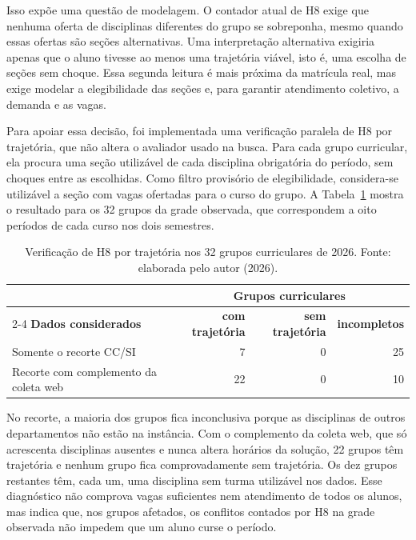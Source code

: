 Isso expõe uma questão de modelagem. O contador atual de H8 exige que nenhuma oferta de disciplinas diferentes do grupo se sobreponha, mesmo quando essas ofertas são seções alternativas. Uma interpretação alternativa exigiria apenas que o aluno tivesse ao menos uma trajetória viável, isto é, uma escolha de seções sem choque. Essa segunda leitura é mais próxima da matrícula real, mas exige modelar a elegibilidade das seções e, para garantir atendimento coletivo, a demanda e as vagas.

Para apoiar essa decisão, foi implementada uma verificação paralela de H8 por trajetória, que não altera o avaliador usado na busca. Para cada grupo curricular, ela procura uma seção utilizável de cada disciplina obrigatória do período, sem choques entre as escolhidas. Como filtro provisório de elegibilidade, considera-se utilizável a seção com vagas ofertadas para o curso do grupo. A Tabela~\ref{tab:trajetorias} mostra o resultado para os 32 grupos da grade observada, que correspondem a oito períodos de cada curso nos dois semestres.

\begin{table}[htbp]
  \centering
  \caption{Verificação de H8 por trajetória nos 32 grupos curriculares de 2026. Fonte: elaborada pelo autor (2026).}
  \label{tab:trajetorias}
  \small
  \begin{tabular}{p{6cm}rrr}
    \toprule
    & \multicolumn{3}{c}{\textbf{Grupos curriculares}} \\
    \cmidrule(lr){2-4}
    \textbf{Dados considerados} & \textbf{com trajetória} & \textbf{sem trajetória} & \textbf{incompletos} \\
    \midrule
    Somente o recorte CC/SI & 7 & 0 & 25 \\
    Recorte com complemento da coleta web & 22 & 0 & 10 \\
    \bottomrule
  \end{tabular}
\end{table}

No recorte, a maioria dos grupos fica inconclusiva porque as disciplinas de outros departamentos não estão na instância. Com o complemento da coleta web, que só acrescenta disciplinas ausentes e nunca altera horários da solução, 22 grupos têm trajetória e nenhum grupo fica comprovadamente sem trajetória. Os dez grupos restantes têm, cada um, uma disciplina sem turma utilizável nos dados. Esse diagnóstico não comprova vagas suficientes nem atendimento de todos os alunos, mas indica que, nos grupos afetados, os conflitos contados por H8 na grade observada não impedem que um aluno curse o período. 

